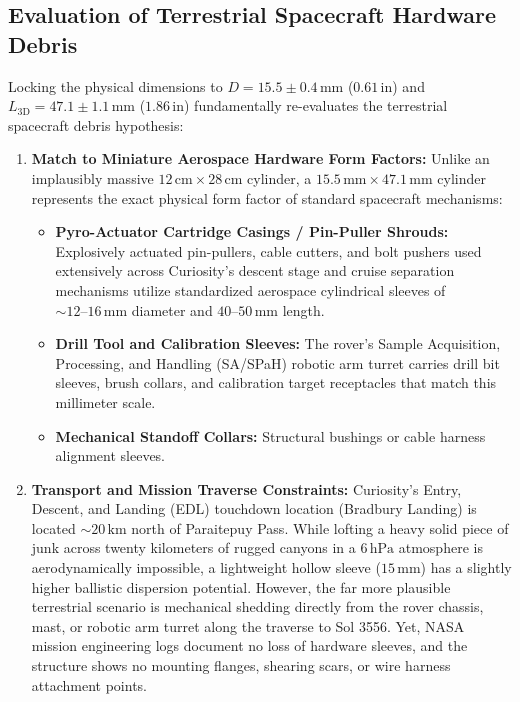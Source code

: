 \documentclass[11pt,a4paper]{article}
\begin{document}
\subsection{Evaluation of Terrestrial Spacecraft Hardware Debris}
Locking the physical dimensions to $D = 15.5 \pm 0.4\,\text{mm}$ ($0.61\,\text{in}$) and $L_{\text{3D}} = 47.1 \pm 1.1\,\text{mm}$ ($1.86\,\text{in}$) fundamentally re-evaluates the terrestrial spacecraft debris hypothesis:
\begin{enumerate}
    \item \textbf{Match to Miniature Aerospace Hardware Form Factors:} Unlike an implausibly massive $12\,\text{cm} \times 28\,\text{cm}$ cylinder, a $15.5\,\text{mm} \times 47.1\,\text{mm}$ cylinder represents the exact physical form factor of standard spacecraft mechanisms:
    \begin{itemize}
        \item \textbf{Pyro-Actuator Cartridge Casings / Pin-Puller Shrouds:} Explosively actuated pin-pullers, cable cutters, and bolt pushers used extensively across Curiosity's descent stage and cruise separation mechanisms utilize standardized aerospace cylindrical sleeves of $\sim 12\text{--}16\,\text{mm}$ diameter and $40\text{--}50\,\text{mm}$ length.
        \item \textbf{Drill Tool and Calibration Sleeves:} The rover's Sample Acquisition, Processing, and Handling (SA/SPaH) robotic arm turret carries drill bit sleeves, brush collars, and calibration target receptacles that match this millimeter scale.
        \item \textbf{Mechanical Standoff Collars:} Structural bushings or cable harness alignment sleeves.
    \end{itemize}
    \item \textbf{Transport and Mission Traverse Constraints:} Curiosity's Entry, Descent, and Landing (EDL) touchdown location (Bradbury Landing) is located $\sim 20\,\text{km}$ north of Paraitepuy Pass. While lofting a heavy solid piece of junk across twenty kilometers of rugged canyons in a $6\,\text{hPa}$ atmosphere is aerodynamically impossible, a lightweight hollow sleeve ($15\,\text{mm}$) has a slightly higher ballistic dispersion potential. However, the far more plausible terrestrial scenario is mechanical shedding directly from the rover chassis, mast, or robotic arm turret along the traverse to Sol 3556. Yet, NASA mission engineering logs document no loss of hardware sleeves, and the structure shows no mounting flanges, shearing scars, or wire harness attachment points.
\end{enumerate}
\end{document}
